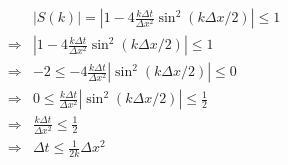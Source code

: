 \documentclass[12pt,a4]{article}
\begin{document}
\begin{enumerate}
    \begin{align*}
                  & |S(k)| = |1 - 4\frac{k \Delta t}{\Delta x^2} \sin^2(k\Delta x / 2)| \leq 1\\
      \Rightarrow & |1 - 4\frac{k \Delta t}{\Delta x^2} \sin^2(k\Delta x / 2)| \leq 1\\
      \Rightarrow & -2 \leq - 4\frac{k \Delta t}{\Delta x^2} |\sin^2(k\Delta x / 2)| \leq 0\\
      \Rightarrow & 0 \leq \frac{k \Delta t}{\Delta x^2} |\sin^2(k\Delta x / 2)| \leq \frac{1}{2}\\
      \Rightarrow & \frac{k \Delta t}{\Delta x^2} \leq \frac{1}{2}\\
      \Rightarrow & \Delta t \leq \frac{1}{2 k}\Delta x^2
    \end{align*}
\end{enumerate}
\end{document}
